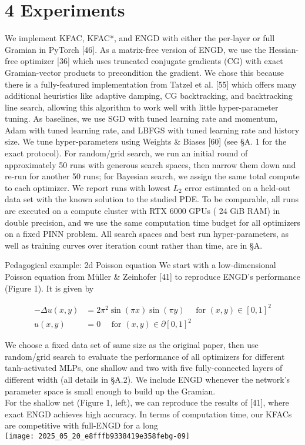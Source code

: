 \documentclass[10pt]{article}
\begin{document}
\section*{4 Experiments}
We implement KFAC, KFAC*, and ENGD with either the per-layer or full Gramian in PyTorch [46]. As a matrix-free version of ENGD, we use the Hessian-free optimizer [36] which uses truncated conjugate gradients (CG) with exact Gramian-vector products to precondition the gradient. We chose this because there is a fully-featured implementation from Tatzel et al. [55] which offers many additional heuristics like adaptive damping, CG backtracking, and backtracking line search, allowing this algorithm to work well with little hyper-parameter tuning. As baselines, we use SGD with tuned learning rate and momentum, Adam with tuned learning rate, and LBFGS with tuned learning rate and history size. We tune hyper-parameters using Weights \& Biases [60] (see §A. 1 for the exact protocol). For random/grid search, we run an initial round of approximately 50 runs with generous search spaces, then narrow them down and re-run for another 50 runs; for Bayesian search, we assign the same total compute to each optimizer. We report runs with lowest $L_{2}$ error estimated on a held-out data set with the known solution to the studied PDE. To be comparable, all runs are executed on a compute cluster with RTX 6000 GPUs ( 24 GiB RAM) in double precision, and we use the same computation time budget for all optimizers on a fixed PINN problem. All search spaces and best run hyper-parameters, as well as training curves over iteration count rather than time, are in §A.

Pedagogical example: 2d Poisson equation We start with a low-dimensional Poisson equation from Müller \& Zeinhofer [41] to reproduce ENGD's performance (Figure 1). It is given by


\begin{align*}
-\Delta u(x, y) & =2 \pi^{2} \sin (\pi x) \sin (\pi y) \quad \text { for }(x, y) \in[0,1]^{2} \\
u(x, y) & =0 \quad \text { for }(x, y) \in \partial[0,1]^{2} \tag{16}
\end{align*}


We choose a fixed data set of same size as the original paper, then use random/grid search to evaluate the performance of all optimizers for different tanh-activated MLPs, one shallow and two with five fully-connected layers of different width (all details in §A.2). We include ENGD whenever the network's parameter space is small enough to build up the Gramian.\\[0pt]
For the shallow net (Figure 1, left), we can reproduce the results of [41], where exact ENGD achieves high accuracy. In terms of computation time, our KFACs are competitive with full-ENGD for a long\\
\texttt{[image: 2025\_05\_20\_e8fffb9338419e358febg-09]}
\end{document}
